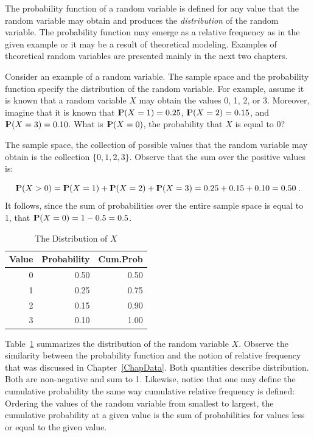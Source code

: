 \documentclass[]{krantz}
\newcommand{\Prob}{{\rm I\kern-.3em P}}
\theoremstyle{definition}
\theoremstyle{definition}
\theoremstyle{definition}
\theoremstyle{remark}
\begin{document}
The probability function of a random variable is defined for any value
that the random variable may obtain and produces the \emph{distribution}
of the random variable. The probability function may emerge as a
relative frequency as in the given example or it may be a result of
theoretical modeling. Examples of theoretical random variables are
presented mainly in the next two chapters.

Consider an example of a random variable. The sample space and the
probability function specify the distribution of the random variable.
For example, assume it is known that a random variable \(X\) may obtain
the values 0, 1, 2, or 3. Moreover, imagine that it is known that
\(\Prob(X=1) = 0.25\), \(\Prob(X=2) = 0.15\), and \(\Prob(X=3)= 0.10\).
What is \(\Prob(X=0)\), the probability that \(X\) is equal to 0?

The sample space, the collection of possible values that the random
variable may obtain is the collection \(\{0,1,2,3\}\). Observe that the
sum over the positive values is:

\[\Prob(X > 0) = \Prob(X=1) + \Prob(X=2) + \Prob(X=3) = 0.25 + 0.15 + 0.10 = 0.50\;.\]
It follows, since the sum of probabilities over the entire sample space
is equal to 1, that \(\Prob(X=0) = 1- 0.5 = 0.5\).

\begin{table}

\caption{\label{tab:Probability1}The Distribution of $X$}
\centering
\begin{tabular}[t]{rrr}
\toprule
Value & Probability & Cum.Prob\\
\midrule
0 & 0.50 & 0.50\\
1 & 0.25 & 0.75\\
2 & 0.15 & 0.90\\
3 & 0.10 & 1.00\\
\bottomrule
\end{tabular}
\end{table}

Table~\ref{tab:Probability1} summarizes the distribution of the random
variable \(X\). Observe the similarity between the probability function
and the notion of relative frequency that was discussed in
Chapter~\ref{ChapData}. Both quantities describe distribution. Both are
non-negative and sum to 1. Likewise, notice that one may define the
cumulative probability the same way cumulative relative frequency is
defined: Ordering the values of the random variable from smallest to
largest, the cumulative probability at a given value is the sum of
probabilities for values less or equal to the given value.
\end{document}
